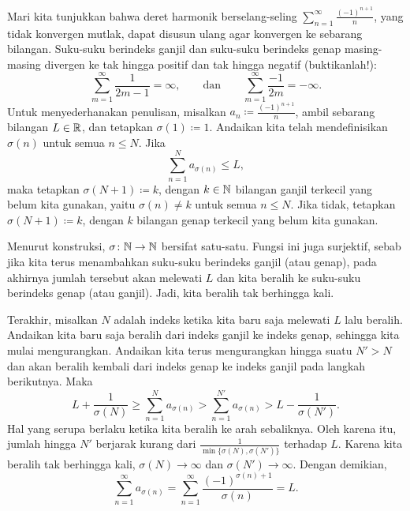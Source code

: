 \begin{example} \label{example:harmonsumanything}
Mari kita tunjukkan bahwa deret harmonik berselang-seling
$\sum_{n=1}^\infty \frac{{(-1)}^{n+1}}{n}$, yang tidak konvergen mutlak, dapat
disusun ulang agar konvergen ke sebarang bilangan.
Suku-suku berindeks ganjil dan suku-suku berindeks genap masing-masing divergen ke
tak hingga positif dan tak hingga negatif (buktikanlah!):
\begin{equation*}
\sum_{m=1}^\infty \frac{1}{2m-1} = \infty, \qquad \text{dan} \qquad
\sum_{m=1}^\infty \frac{-1}{2m} = -\infty .
\end{equation*}
Untuk menyederhanakan penulisan, misalkan $a_n \coloneqq \frac{{(-1)}^{n+1}}{n}$,
ambil sebarang bilangan $L \in {\mathbb{R}}$, dan tetapkan $\sigma(1) \coloneqq 1$.
Andaikan kita telah
mendefinisikan $\sigma(n)$ untuk semua $n \leq N$.  Jika
\begin{equation*}
\sum_{n=1}^N a_{\sigma(n)} \leq L ,
\end{equation*}
maka tetapkan $\sigma(N+1) \coloneqq k$, dengan $k \in {\mathbb{N}}$ bilangan ganjil terkecil
yang belum kita gunakan,
yaitu $\sigma(n) \neq k$ untuk semua $n \leq N$.
Jika tidak, tetapkan $\sigma(N+1) \coloneqq k$, dengan $k$
bilangan genap terkecil yang belum kita gunakan.

Menurut konstruksi, $\sigma \colon {\mathbb{N}} \to {\mathbb{N}}$ bersifat satu-satu.
Fungsi ini juga surjektif, sebab jika kita terus menambahkan suku-suku berindeks ganjil (atau genap),
pada akhirnya jumlah tersebut akan melewati $L$ dan kita beralih
ke suku-suku berindeks genap (atau ganjil).  Jadi, kita beralih tak berhingga kali.

Terakhir, misalkan $N$ adalah indeks ketika kita baru saja melewati $L$ lalu beralih.
Andaikan kita baru saja beralih dari indeks ganjil ke indeks genap, sehingga kita mulai
mengurangkan.
Andaikan kita terus mengurangkan hingga suatu
$N' > N$ dan akan beralih kembali dari indeks genap ke indeks ganjil pada langkah berikutnya.
Maka
\begin{equation*}
L + \frac{1}{\sigma(N)} \geq \sum_{n=1}^{N} a_{\sigma(n)}
> \sum_{n=1}^{N'} a_{\sigma(n)} > L- \frac{1}{\sigma(N')}.
\end{equation*}
Hal yang serupa berlaku ketika kita beralih ke arah sebaliknya.
Oleh karena itu,
jumlah hingga $N'$ berjarak kurang dari $\frac{1}{\min \{ \sigma(N), \sigma(N') \}}$
terhadap $L$.  Karena
kita beralih tak berhingga kali, $\sigma(N) \to \infty$
dan $\sigma(N') \to \infty$. Dengan demikian,
\begin{equation*}
\sum_{n=1}^\infty a_{\sigma(n)} = 
\sum_{n=1}^\infty \frac{{(-1)}^{\sigma(n)+1}}{\sigma(n)} = L .
\end{equation*}


\end{example}
